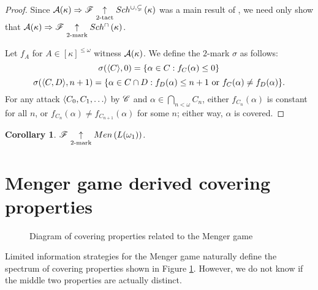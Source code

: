 \documentclass{amsart}
\newtheorem{corollary}[theorem]{Corollary}
\theoremstyle{definition}
\begin{document}
\begin{proof}
  Since \(\mathcal{A}(\kappa)\Rightarrow\mathscr{F} \underset{2\text{-tact}}{\uparrow}Sch^{\cup,\subsetneq}\left({\kappa}\right)\) was
  a main result of \cite{MR1129143}, we need only show that
  \(\mathcal{A}(\kappa)\Rightarrow \mathscr{F} \underset{2\text{-mark}}{\uparrow}Sch^{\cap}\left({\kappa}\right)\).

  Let \(f_A\) for \(A\in[\kappa]^{\leq\omega}\) witness \(\mathcal{A}(\kappa)\). We define
  the \(2\)-mark \(\sigma\) as follows:
    \[
      \sigma(\langle C\rangle,0) = \{\alpha\in C: f_C(\alpha) \leq 0 \}
    \]
    \[
      \sigma(\langle C,D\rangle,n+1)
        =
      \{
        \alpha \in C\cap D
      :
        f_D(\alpha) \leq n+1 \text{ or }
        f_C(\alpha)\not=f_D(\alpha)
      \}
    .\]
  For any attack \(\<C_0,C_1,\dots\>\) by \(\mathscr{C}\) and
  \(\alpha\in\bigcap_{n<\omega}C_n\), either \(f_{C_n}(\alpha)\) is constant for
  all \(n\), or \(f_{C_n}(\alpha)\not=f_{C_{n+1}}(\alpha)\) for some \(n\);
  either way, \(\alpha\) is covered.
\end{proof}

\begin{corollary}
  \(\mathscr{F} \underset{2\text{-mark}}{\uparrow}Men\left({L(\omega_1)}\right)\).
\end{corollary}



\section{Menger game derived covering properties}

\begin{figure}[h]
\caption{Diagram of covering properties related to the Menger game}
\label{menSpec}
\end{figure}

Limited information strategies for the Menger game naturally define the
spectrum of covering properties shown in Figure \ref{menSpec}. However,
we do not know if the middle two properties are actually distinct.
\end{document}
